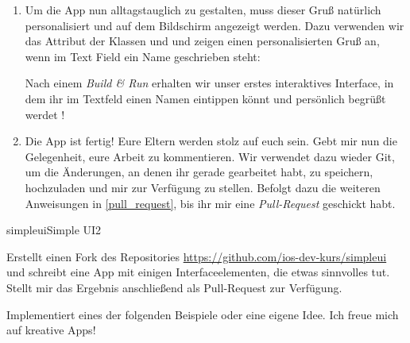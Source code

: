\documentclass[parskip=half, final]{scrreprt}
\begin{document}
\begin{lecture}
\begin{enumerate}
\item Um die App nun alltagstauglich zu gestalten, muss dieser Gruß natürlich personalisiert und auf dem Bildschirm angezeigt werden. Dazu verwenden wir das Attribut  der Klassen  und  und zeigen einen personalisierten Gruß an, wenn im Text Field ein Name geschrieben steht:


Nach einem \emph{Build \& Run} erhalten wir unser erstes interaktives Interface, in dem ihr im Textfeld einen Namen eintippen könnt und persönlich begrüßt werdet !


\item Die App ist fertig! Eure Eltern werden stolz auf euch sein. Gebt mir nun die Gelegenheit, eure Arbeit zu kommentieren. Wir verwendet dazu wieder Git, um die Änderungen, an denen ihr gerade gearbeitet habt, zu speichern, hochzuladen und mir zur Verfügung zu stellen. Befolgt dazu die weiteren Anweisungen in \autoref{pull_request}, bis ihr mir eine \emph{Pull-Request} geschickt habt.

\end{enumerate}

\begin{exc}

\begin{excitem}{simpleui}{Simple UI}{2}

Erstellt einen Fork des Repositories \url{https://github.com/ios-dev-kurs/simpleui} und schreibt eine App mit einigen Interfaceelementen, die etwas sinnvolles tut. Stellt mir das Ergebnis anschließend als Pull-Request zur Verfügung.

Implementiert eines der folgenden Beispiele oder eine eigene Idee. Ich freue mich auf kreative Apps!


\end{excitem}
\end{exc}
\end{lecture}
\end{document}

